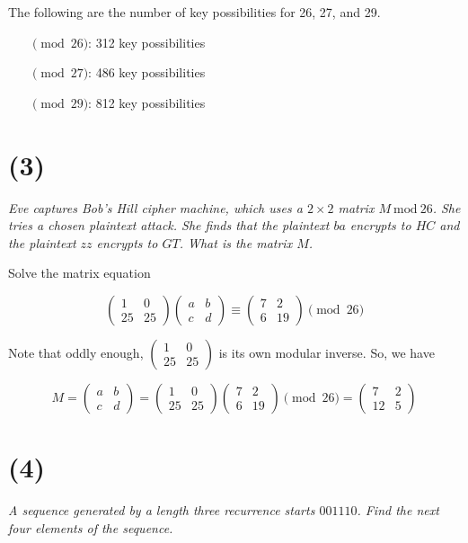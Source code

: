 \documentclass[12pt]{article}
\renewcommand{\mod}[1]{\ \mathrm{mod}\ #1}
\begin{document}
The following are the number of key possibilities for 26, 27, and 29.

\begin{itemize}
  \item[$\pmod{26}$:] 312 key possibilities
  \item[$\pmod{27}$:] 486 key possibilities
  \item[$\pmod{29}$:] 812 key possibilities
\end{itemize}

\section*{(3)} \textit{Eve captures Bob’s Hill cipher machine, which uses a $2\times2$ matrix $M \mod{26}$. She tries a chosen plaintext attack. She finds that the plaintext $ba$ encrypts to $HC$ and the plaintext $zz$ encrypts to $GT$. What is the matrix $M$.}

Solve the matrix equation

$$\begin{pmatrix}1 & 0\\25 & 25\end{pmatrix}\begin{pmatrix}a & b\\c & d\end{pmatrix} \equiv \begin{pmatrix}7 & 2\\6 & 19\end{pmatrix} \pmod{26}$$

Note that oddly enough, $\begin{pmatrix}1 & 0\\25 & 25\end{pmatrix}$ is its own modular inverse. So, we have

$$M = \begin{pmatrix}a & b\\c & d\end{pmatrix} = \begin{pmatrix}1 & 0\\25 & 25\end{pmatrix}\begin{pmatrix}7 & 2\\6 & 19\end{pmatrix} \pmod{26} = \begin{pmatrix}7 & 2\\12 & 5\end{pmatrix}$$

\section*{(4)} \textit{A sequence generated by a length three recurrence starts $001110$. Find the next four elements of the sequence.}
\end{document}
